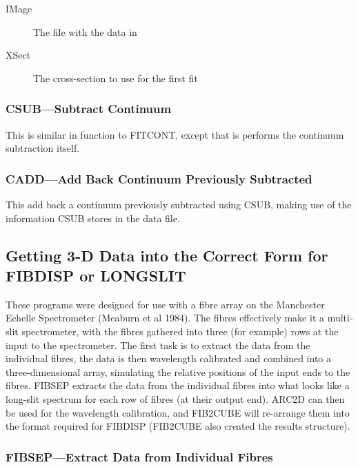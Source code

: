 \begin{description}
\item[IMage] The file with the data in
\item[XSect] The cross-section to use for the first fit
\end{description}


\subsubsection{CSUB---Subtract Continuum}

This is similar in function to FITCONT, except that is performs the
continuum subtraction itself.

\subsubsection{CADD---Add Back Continuum Previously Subtracted}

This add back a continuum previously subtracted using CSUB, making use
of the information CSUB stores in the data file.

\subsection{\label{getting_3d_data_into_the_correct_form}Getting 3-D Data into the Correct Form for FIBDISP or LONGSLIT}

These programs were designed for use with a fibre array on the
Manchester Echelle Spectrometer (Meaburn et al 1984).
The fibres effectively make it a multi-slit spectrometer, with the
fibres gathered into three (for example) rows at the input to the
spectrometer.
The first task is to extract the data from the individual fibres, the
data is then wavelength calibrated and combined into a three-dimensional
array, simulating the relative positions of the input ends to the
fibres.
FIBSEP extracts the data from the individual fibres into what looks like a
long-slit spectrum for each row of fibres (at their output end).
ARC2D can then be used for the wavelength calibration, and FIB2CUBE will
re-arrange them into the format required for FIBDISP (FIB2CUBE also
created the results structure).

\subsubsection{FIBSEP---Extract Data from Individual Fibres}

